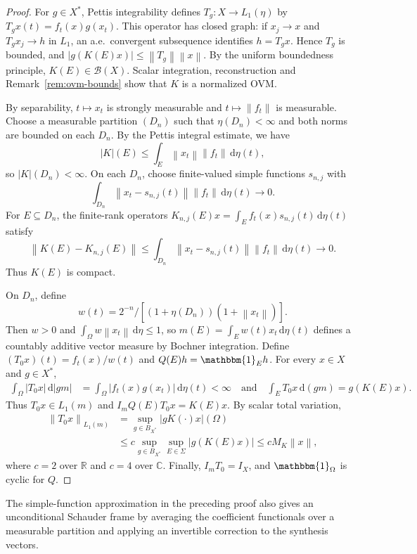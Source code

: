\documentclass[11pt,leqno]{amsart}
\theoremstyle{compact}
\numberwithin{equation}{section}
\theoremstyle{compactremark}
\theoremstyle{compact}
\newcommand{\1}{\mathbbm{1}}
\newcommand{\rmd}{\mathrm{d}}
\newcommand{\R}{\mathbb{R}}
\newcommand{\cB}{\mathcal{B}}
\newcommand{\norm}[1]{\left\|#1\right\|}
\newcommand{\abs}[1]{\left|#1\right|}
\begin{document}
\begin{proof}
For $g\in X^*$, Pettis integrability defines $T_g:X\to L_1(\eta)$ by $T_gx(t)=f_t(x)g(x_t)$. This operator has closed graph: if $x_j\to x$ and $T_gx_j\to h$ in $L_1$, an a.e.\ convergent subsequence identifies $h=T_gx$. Hence $T_g$ is bounded, and $\abs{g(K(E)x)}\leq\norm{T_g}\norm{x}$. By the uniform boundedness principle, $K(E)\in\cB(X)$. Scalar integration, reconstruction and Remark~\ref{rem:ovm-bounds} show that $K$ is a normalized OVM.

By separability, $t\mapsto x_t$ is strongly measurable and $t\mapsto\norm{f_t}$ is measurable. Choose a measurable partition $(D_n)$ such that $\eta(D_n)<\infty$ and both norms are bounded on each $D_n$. By the Pettis integral estimate, we have
\[
\abs{K}(E)\leq\int_E\norm{x_t}\norm{f_t}\,\rmd\eta(t),
\]
so $\abs{K}(D_n)<\infty$. On each $D_n$, choose finite-valued simple functions $s_{n,j}$ with
\[
\int_{D_n}\norm{x_t-s_{n,j}(t)}\norm{f_t}\,\rmd\eta(t)\to0.
\]
For $E\subseteq D_n$, the finite-rank operators $K_{n,j}(E)x=\int_E f_t(x)s_{n,j}(t)\,\rmd\eta(t)$ satisfy
\[
\norm{K(E)-K_{n,j}(E)}\leq\int_{D_n}\norm{x_t-s_{n,j}(t)}\norm{f_t}\,\rmd\eta(t)\longrightarrow0.
\]
Thus $K(E)$ is compact.

On $D_n$, define
\[
w(t)=2^{-n}/[(1+\eta(D_n))(1+\norm{x_t})].
\]
Then $w>0$ and $\int_\Omega w\norm{x_t}\,\rmd\eta\leq1$, so $m(E)=\int_Ew(t)x_t\,\rmd\eta(t)$ defines a countably additive vector measure by Bochner integration. Define $(T_0x)(t)=f_t(x)/w(t)$ and $Q(E)h=\1_Eh$. For every $x\in X$ and $g\in X^*$,
\begin{align*}
\int_\Omega\abs{T_0x}\,\rmd\abs{gm}
&=\int_\Omega\abs{f_t(x)g(x_t)}\,\rmd\eta(t)<\infty
  \quad\text{and}\quad \int_E T_0x\,\rmd(gm)=g(K(E)x).
\end{align*}
Thus $T_0x\in L_1(m)$ and $I_mQ(E)T_0x=K(E)x$. By scalar total variation,
\begin{align*}
\norm{T_0x}_{L_1(m)}
&=\sup_{g\in B_{X^*}}\abs{gK(\cdot)x}(\Omega)\\
&\leq c\sup_{g\in B_{X^*}}\sup_{E\in\Sigma}\abs{g(K(E)x)}
\leq cM_K\norm{x},
\end{align*}
where $c=2$ over $\R$ and $c=4$ over $\mathbb C$. Finally, $I_mT_0=I_X$, and $\1_\Omega$ is cyclic for $Q$.
\end{proof}

The simple-function approximation in the preceding proof also gives an unconditional Schauder frame by averaging the coefficient functionals over a measurable partition and applying an invertible correction to the synthesis vectors.
\end{document}
